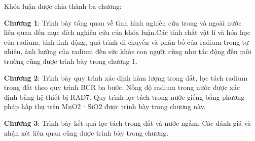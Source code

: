 Khóa luận được chia thành ba chương:

\textbf{Chương 1}: Trình bày tổng quan về tình hình nghiên cứu trong và ngoài nước liên quan đến mục đích nghiên cứu của khóa luận.Các tính chất vật lí và hóa học của radium, tính linh động, quá trình di chuyển và phân bố của radium trong tự nhiên, ảnh hưởng của radium đến sức khỏe con người cũng như tác động đến môi trường cũng được trình bày trong chương 1.

\textbf{Chương 2}: Trình bày quy trình xác định hàm lượng  trong đất, lọc tách radium trong đất theo quy trình BCR ba bước. Nồng độ radium trong nước được xác định bằng hệ thiết bị RAD7. Quy trình lọc tách  trong nước giếng bằng phương pháp hấp thụ trên MnO2 ⋅ SiO2 được trình bày trong chương này.

\textbf{Chương 3}: Trình bày kết quả lọc tách  trong đất và nước ngầm. Các đánh giá và nhận xét liên quan cũng được trình bày trong chương.

